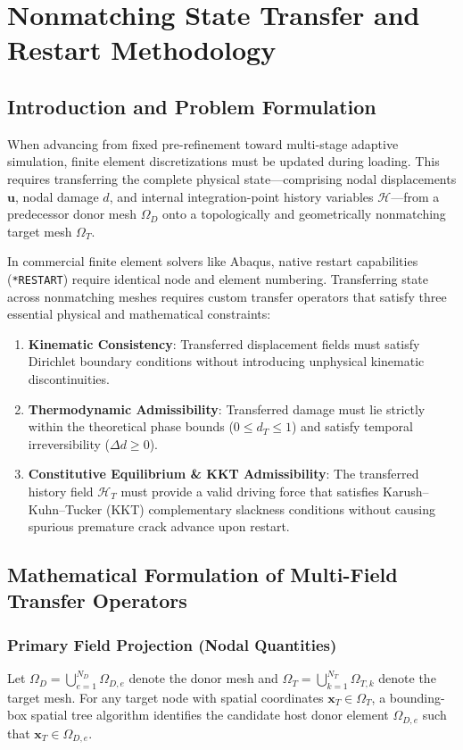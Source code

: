 \chapter{Nonmatching State Transfer and Restart Methodology}
\label{chap:state_transfer}

\section{Introduction and Problem Formulation}
\label{sec:transfer_intro}

When advancing from fixed pre-refinement toward multi-stage adaptive simulation, finite element discretizations must be updated during loading. This requires transferring the complete physical state---comprising nodal displacements $\mathbf{u}$, nodal damage $d$, and internal integration-point history variables $\mathcal{H}$---from a predecessor donor mesh $\Omega_D$ onto a topologically and geometrically nonmatching target mesh $\Omega_T$.

In commercial finite element solvers like Abaqus, native restart capabilities (\texttt{*RESTART}) require identical node and element numbering. Transferring state across nonmatching meshes requires custom transfer operators that satisfy three essential physical and mathematical constraints:
\begin{enumerate}
    \item \textbf{Kinematic Consistency}: Transferred displacement fields must satisfy Dirichlet boundary conditions without introducing unphysical kinematic discontinuities.
    \item \textbf{Thermodynamic Admissibility}: Transferred damage must lie strictly within the theoretical phase bounds ($0 \le d_T \le 1$) and satisfy temporal irreversibility ($\Delta d \ge 0$).
    \item \textbf{Constitutive Equilibrium \& KKT Admissibility}: The transferred history field $\mathcal{H}_T$ must provide a valid driving force that satisfies Karush--Kuhn--Tucker (KKT) complementary slackness conditions without causing spurious premature crack advance upon restart.
\end{enumerate}

\section{Mathematical Formulation of Multi-Field Transfer Operators}
\label{sec:transfer_operators}

\subsection{Primary Field Projection (Nodal Quantities)}
Let $\Omega_D = \bigcup_{e=1}^{N_D} \Omega_{D,e}$ denote the donor mesh and $\Omega_T = \bigcup_{k=1}^{N_T} \Omega_{T,k}$ denote the target mesh. For any target node with spatial coordinates $\mathbf{x}_T \in \Omega_T$, a bounding-box spatial tree algorithm identifies the candidate host donor element $\Omega_{D,e}$ such that $\mathbf{x}_T \in \Omega_{D,e}$.

